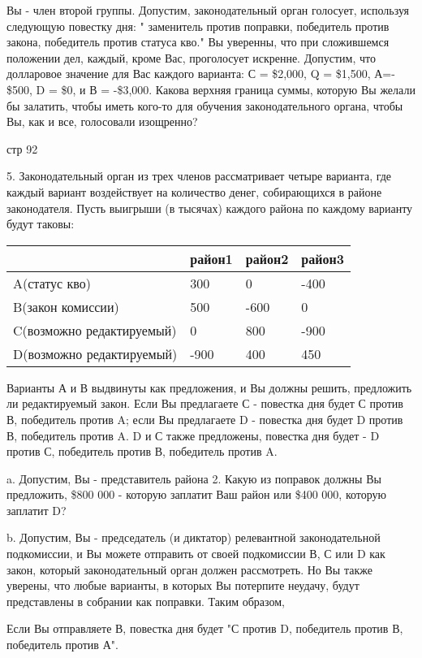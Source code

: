 \documentclass[a4paper,12pt]{article}
\begin{document}
Вы - член второй группы. Допустим, законодательный
орган голосует, используя следующую повестку дня: "
заменитель против поправки, победитель против
закона, победитель против статуса кво." Вы
уверенны, что при сложившемся положении дел,
каждый, кроме Вас, проголосует искренне. Допустим,
что долларовое значение для Вас каждого варианта: С
= \$2,000, Q = \$1,500, А=- \$500, D = \$0, и В =
-\$3,000. Какова верхняя граница суммы, которую Вы
желали бы залатить, чтобы иметь кого-то для
обучения законодательного органа, чтобы Вы, как и
все, голосовали изощренно?

стр 92

5. Законодательный орган из трех членов
рассматривает четыре варианта, где каждый вариант
воздействует на количество денег, собирающихся в
районе законодателя. Пусть выигрыши (в тысячах)
каждого района по каждому варианту будут таковы:

\begin{tabular}{l|lll|}
\cline{2-4} & район1 & \multicolumn{1}{|l}{район2}
& \multicolumn{1}{|l|}{район3} \\ \hline
\multicolumn{1}{|l|}{A(статус кво)} & 300 & 0 & -400 \\
\multicolumn{1}{|l|}{B(закон комиссии)} & 500 & -600 & 0 \\
\multicolumn{1}{|l|}{C(возможно редактируемый)} & 0 & 800 & -900 \\
\multicolumn{1}{|l|}{D(возможно редактируемый)} &
-900 & 400 & 450 \\ \hline
\end{tabular}

Варианты А и В выдвинуты как предложения, и Вы
должны решить, предложить ли редактируемый закон.
Если Вы предлагаете С - повестка дня будет С против
В, победитель против A; если Вы предлагаете D -
повестка дня будет D против В, победитель против A.
D и С также предложены, повестка дня будет - D
против С, победитель против В, победитель против A.

a. Допустим, Вы - представитель района 2. Какую из
поправок должны Вы предложить, \$800 000 - которую
заплатит Ваш район или \$400 000, которую заплатит
D?

b. Допустим, Вы - председатель (и диктатор)
релевантной законодательной подкомиссии, и Вы
можете отправить от своей подкомиссии В, С или D
как закон, который законодательный орган должен
рассмотреть. Но Вы также уверены, что любые
варианты, в которых Вы потерпите неудачу, будут
представлены в собрании как поправки. Таким
образом,

Если Вы отправляете В, повестка дня будет "С против
D, победитель против В, победитель против А".
\end{document}

